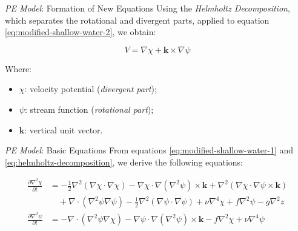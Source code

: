 
\begin{frame}{\textit{PE Model}: Formation of New Equations}
	Using the \textit{Helmholtz Decomposition}, which separates the rotational and divergent parts, applied to equation \eqref{eq:modified-shallow-water-2}, we obtain:
		
	\begin{equation}
		V = \nabla\chi + \mathbf{k} \times \nabla \psi \label{eq:helmholtz-decomposition}
	\end{equation}
		
	Where:
	\begin{itemize}
		\item $\chi$: velocity potential (\textit{divergent part});
		\item $\psi$: stream function (\textit{rotational part});
		\item $\mathbf{k}$: vertical unit vector.
	\end{itemize}
\end{frame}


\begin{frame}{\textit{PE Model}: Basic Equations}
	From equations \eqref{eq:modified-shallow-water-1} and \eqref{eq:helmholtz-decomposition}, we derive the following equations:
	\begin{small}
		\begin{align}
			\frac{\partial \nabla^2 \chi}{\partial t} & = -\frac{1}{2}\nabla^2(\nabla \chi \cdot \nabla \chi) - \nabla \chi \cdot \nabla(\nabla^2\psi) \times \mathbf{k} + \nabla^2(\nabla \chi \cdot \nabla \psi \times \mathbf{k}) \nonumber \\
			                                          & \quad + \nabla \cdot (\nabla^2\psi\nabla\psi) - \frac{1}{2}\nabla^2(\nabla \psi \cdot \nabla \psi) + \nu\nabla^4\chi + f\nabla^2\psi - g\nabla^2z \label{eq:basic-equation-1}          \\
			\frac{\partial \nabla^2 \psi}{\partial t} & = -\nabla \cdot (\nabla^2\psi\nabla \chi) - \nabla \psi \cdot \nabla(\nabla^2\psi) \times \mathbf{k} - f\nabla^2\chi + \nu\nabla^4\psi\label{eq:basic-equation-2}                      
		\end{align}
	\end{small}
\end{frame}


